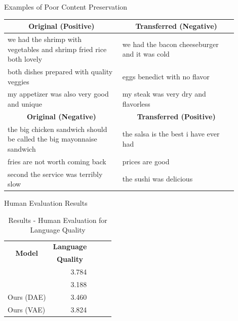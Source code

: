 \documentclass[aspectratio=169]{beamer}
\newcommand{\tabh}[1]{\multicolumn{1}{c|}{\textbf{#1}}}
\newcommand{\tabc}[2]{\multicolumn{1}{|c||}{\multirow{#1}{*}{\textbf{#2}}}}
\begin{document}
\begin{frame}{Examples of Poor Content Preservation}

	\begin{table}[ht]
		\centering
		\begin{tabular}{| p{0.45\linewidth} || p{0.45\linewidth} |}
			\hline
			\tabc{1}{Original (Positive)}                                         & \tabh{Transferred (Negative)}                 \\
			\hline
			\hline
			we had the shrimp with vegetables and shrimp fried rice both lovely   & we had the bacon cheeseburger and it was cold \\
			\hline
			both dishes prepared with quality veggies                             & eggs benedict with no flavor                  \\
			\hline
			my appetizer was also very good and unique                            & my steak was very dry and flavorless          \\
			\hline
			\hline
			\tabc{1}{Original (Negative)}                                         & \tabh{Transferred (Positive)}                 \\
			\hline
			\hline
			the big chicken sandwich should be called the big mayonnaise sandwich & the salsa is the best i have ever had         \\
			\hline
			fries are not worth coming back                                       & prices are good                               \\
			\hline
			second the service was terribly slow                                  & the sushi was delicious                       \\
			\hline
		\end{tabular}
		\label{tab:poor-content-preservation}
	\end{table}
\end{frame}

\begin{frame}{Human Evaluation Results}
	\begin{table}[ht]
		\centering
		\begin{tabular}{| l || r | r | r | r |}
			\hline
			\tabc{2}{Model}       & \tabh{Language} \\
			                      & \tabh{Quality}  \\
			\hline
			\hline
			\citet{shen2017style} & 3.784           \\
			\hline
			\citet{fu2017style}   & 3.188           \\
			\hline
			Ours (DAE)            & 3.460           \\
			\hline
			Ours (VAE)            & 3.824           \\
			\hline
		\end{tabular}
		\caption{Results - Human Evaluation for Language Quality}
		\label{tab:human-evaluation}
	\end{table}
\end{frame}
\end{document}
